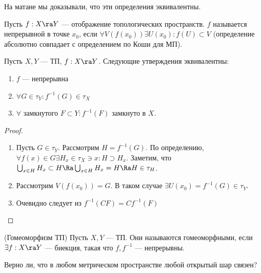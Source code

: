 \begin{note}
    На матане мы доказывали, что эти определения эквивалентны.
\end{note}

\begin{definition}
    Пусть \(f: X \ra Y\) --- отображение топологических пространств. \(f\) называется непрерывной в точке \(x_0\), если \(\forall V(f(x_0)) \exists U(x_0): f(U) \subset V\) (определение абсолютно совпадает с определением по Коши для МП).
\end{definition}

\begin{theorem}
    Пусть \(X, Y\) --- ТП, \(f: X \ra Y\). Следующие утверждения эквивалентны:
    \begin{enumerate}
        \item \(f\) --- непрерывна
        \item \(\forall G \in \tau_Y: f^{-1}(G) \in \tau_X\)
        \item \(\forall\) замкнутого \(F \subset Y: f^{-1}(F)\) замкнуто в \(X\).
    \end{enumerate}
\end{theorem}
\begin{proof}\indent
    \begin{enumerate}
        \item[\((1) \Ra (2)\)] Пусть \(G \in \tau_Y\). Рассмотрим \(H = f^{-1}(G)\). По определению, \(\forall f(x) \in G \exists H_x \in \tau_X \ni x: H \supset H_x\). Заметим, что \(\bigcup_{x \in H} H_x \subset H \Ra \bigcup_{x \in H} H_x = H \Ra H \in \tau_H\).
        \item[\((2) \Ra (1)\)] Рассмотрим \(V(f(x_0)) = G\). В таком случае \(\exists U(x_0) = f^{-1}(G) \in \tau_Y\).
        \item[\((2) \Lra (3)\)] Очевидно следует из \(f^{-1}(CF) = Cf^{-1}(F)\)
    \end{enumerate}
\end{proof}

\begin{definition}(Гомеоморфизм ТП)
    Пусть \(X, Y\) --- ТП. Они называются гомеоморфными, если \(\exists f: X \ra Y\) --- биекция, такая что \(f, f^{-1}\) --- непрерывны.
\end{definition}

\begin{exercise}
    Верно ли, что в любом метрическом пространстве любой открытый шар связен?
\end{exercise}

